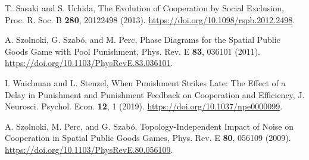 \begin{thebibliography}{04}
T. Sasaki and S. Uchida, The Evolution of Cooperation by Social Exclusion, Proc. R. Soc. B \textbf{280}, 20122498 (2013). \url{https://doi.org/10.1098/rspb.2012.2498}.

A. Szolnoki, G. Szabó, and M. Perc, Phase Diagrams for the Spatial Public Goods Game with Pool Punishment, Phys. Rev. E \textbf{83}, 036101 (2011). \url{https://doi.org/10.1103/PhysRevE.83.036101}.

I. Waichman and L. Stenzel, When Punishment Strikes Late: The Effect of a Delay in Punishment and Punishment Feedback on Cooperation and Efficiency, J. Neurosci. Psychol. Econ. \textbf{12}, 1 (2019). \url{https://doi.org/10.1037/npe0000099}.

A. Szolnoki, M. Perc, and G. Szabó, Topology-Independent Impact of Noise on Cooperation in Spatial Public Goods Games, Phys. Rev. E \textbf{80}, 056109 (2009). \url{https://doi.org/10.1103/PhysRevE.80.056109}.



\end{thebibliography}







